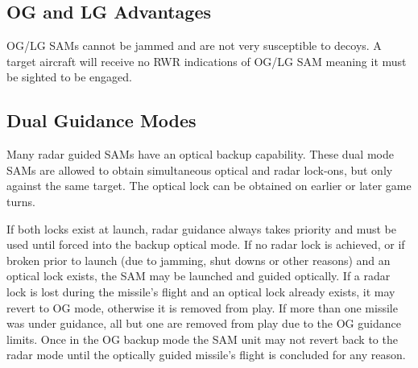 \subsection{OG and LG Advantages} OG/LG SAMs cannot be jammed and are not very susceptible to decoys. A target aircraft will receive no RWR indications of OG/LG SAM meaning it must be sighted to be engaged.


\subsection{Dual Guidance Modes} Many radar guided SAMs have an optical backup capability. These dual mode SAMs are allowed to obtain simultaneous optical and radar lock-ons, but only against the same target. The optical lock can be obtained on earlier or later game turns.

If both locks exist at launch, radar guidance always takes priority and must be used until forced into the backup optical mode. If no radar lock is achieved, or if broken prior to launch (due to jamming, shut downs or other reasons) and an optical lock exists, the SAM may be launched and guided optically. If a radar lock is lost during the missile's flight and an optical lock already exists, it may revert to OG mode, otherwise it is removed from play. If more than one missile was under guidance, all but one are removed from play due to the OG guidance limits. Once in the OG backup mode the SAM unit may not revert back to the radar mode until the optically guided missile's flight is concluded for any reason.